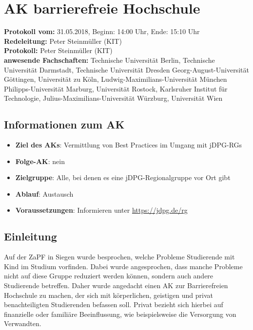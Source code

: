 
\section{AK barrierefreie Hochschule}

  \textbf{Protokoll vom:} 31.05.2018,
  Beginn: 14:00 Uhr,
  Ende: 15:10 Uhr \\
  \textbf{Redeleitung:} Peter Steinmüller (KIT)\\
  \textbf{Protokoll:} Peter Steinmüller (KIT) \\
  \textbf{anwesende Fachschaften:} Technische Universität Berlin, Technische Universität Darmstadt, Technische Universität Dresden Georg-August-Universität Göttingen, Universität zu Köln, Ludwig-Maximilians-Universität München Philipps-Universität Marburg, Universität Rostock, Karlsruher Institut für Technologie, Julius-Maximilians-Universität Würzburg, Universität Wien

  \subsection*{Informationen zum AK}
    \begin{itemize}
      \item \textbf{Ziel des AKs}: Vermittlung von Best Practices im Umgang mit jDPG-RGs
      \item \textbf{Folge-AK}: nein
      \item \textbf{Zielgruppe}: Alle, bei denen es eine jDPG-Regionalgruppe vor Ort gibt
      \item \textbf{Ablauf}: Austausch
      \item \textbf{Voraussetzungen}: Informieren unter \url{https://jdpg.de/rg}
    \end{itemize}

  \subsection*{Einleitung}
    Auf der ZaPF in Siegen wurde besprochen, welche Probleme Studierende mit Kind im Studium vorfinden. Dabei wurde angesprochen, dass manche Probleme nicht auf diese Gruppe reduziert werden können, sondern auch andere Studierende betreffen. Daher wurde angedacht einen AK zur Barrierefreien Hochschule zu machen, der sich mit körperlichen, geistigen und privat benachteiligten Studierenden befassen soll. Privat bezieht sich hierbei auf finanzielle oder familiäre Beeinflussung, wie beispielsweise die Versorgung von Verwandten.

